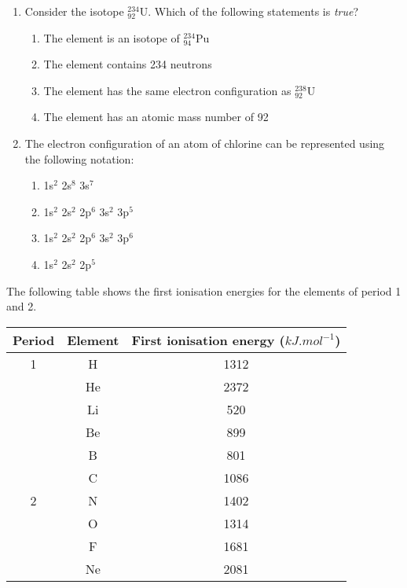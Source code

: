 {\begin{enumerate}
{\begin{enumerate}
	
	\item{Consider the isotope $^{234}_{92}$U. Which of the following statements is \textit{true}?}
		\begin{enumerate}
		\item{The element is an isotope of $^{234}_{94}$Pu}
		\item{The element contains 234 neutrons}
		\item{The element has the same electron configuration as $^{238}_{92}$U}
		\item{The element has an atomic mass number of 92}
		\end{enumerate}

	\item{The electron configuration of an atom of chlorine can be represented using the following notation:}
		\begin{enumerate}
		\item{1s$^{2}$ 2s$^{8}$ 3s$^{7}$}
		\item{1s$^{2}$ 2s$^{2}$ 2p$^{6}$ 3s$^{2}$ 3p$^{5}$}
		\item{1s$^{2}$ 2s$^{2}$ 2p$^{6}$ 3s$^{2}$ 3p$^{6}$}
		\item{1s$^{2}$ 2s$^{2}$ 2p$^{5}$}
		\end{enumerate}
	\end{enumerate}


\item{The following table shows the first ionisation energies for the elements of period 1 and 2. 
\begin{center} 
\begin{tabular}{|c|c|c|} \hline 
Period&Element&First ionisation energy ($kJ.mol^{-1}$)\\[6pt] \hline 
1&H&1312\\ &He&2372\\ \hline 
&Li&520\\ &Be&899\\ &B&801\\ &C&1086\\ 2&N&1402\\ &O&1314\\ &F&1681\\ &Ne&2081\\ \hline 
\end{tabular}
\end{center} 

}}
\end{enumerate}}
